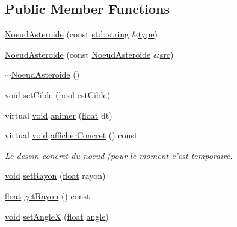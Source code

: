 \subsection*{Public Member Functions}
\begin{DoxyCompactItemize}
\item 
\hyperlink{class_noeud_asteroide_a6879cff59fdc09b742b9e0850bec62a8}{Noeud\-Asteroide} (const \hyperlink{glew_8h_ae84541b4f3d8e1ea24ec0f466a8c568b}{std\-::string} \&\hyperlink{fmod_8h_a5338b9cb3874378d7e5adfbe80a8a381}{type})
\item 
\hyperlink{class_noeud_asteroide_a0cf8165f8385ddfc802312eb3c4abe57}{Noeud\-Asteroide} (const \hyperlink{class_noeud_asteroide}{Noeud\-Asteroide} \&\hyperlink{glew_8h_a72e0fdf0f845ded60b1fada9e9195cd7}{src})
\item 
\hyperlink{class_noeud_asteroide_adbf6fbd81915741bb2f2c44907489e6e}{$\sim$\-Noeud\-Asteroide} ()
\item 
\hyperlink{wglew_8h_aeea6e3dfae3acf232096f57d2d57f084}{void} \hyperlink{class_noeud_asteroide_a987232997d11bee582d5e26cbda9851d}{set\-Cible} (bool est\-Cible)
\item 
virtual \hyperlink{wglew_8h_aeea6e3dfae3acf232096f57d2d57f084}{void} \hyperlink{class_noeud_asteroide_a4f0750d3acc170de96351168456835d8}{animer} (\hyperlink{fmod_8h_aeb841aa4b4b5f444b5d739d865b420af}{float} dt)
\item 
virtual \hyperlink{wglew_8h_aeea6e3dfae3acf232096f57d2d57f084}{void} \hyperlink{class_noeud_asteroide_ab0db59bbf10bb8c24ccf62b84cf2bf10}{afficher\-Concret} () const 
\begin{DoxyCompactList}\small\item\em Le dessin concret du noeud (pour le moment c'est temporaire. \end{DoxyCompactList}\item 
\hyperlink{wglew_8h_aeea6e3dfae3acf232096f57d2d57f084}{void} \hyperlink{class_noeud_asteroide_aa61b44a5531337050117382dd2bbd94d}{set\-Rayon} (\hyperlink{fmod_8h_aeb841aa4b4b5f444b5d739d865b420af}{float} rayon)
\item 
\hyperlink{fmod_8h_aeb841aa4b4b5f444b5d739d865b420af}{float} \hyperlink{class_noeud_asteroide_a2924a9031e94faaf53a26b2afc8f360c}{get\-Rayon} () const 
\item 
\hyperlink{wglew_8h_aeea6e3dfae3acf232096f57d2d57f084}{void} \hyperlink{class_noeud_asteroide_a490e5be76099dfa581df7c104b69162d}{set\-Angle\-X} (\hyperlink{fmod_8h_aeb841aa4b4b5f444b5d739d865b420af}{float} \hyperlink{glew_8h_a6d7a98b0d979b9411a4344a98a7a6122}{angle})

\end{DoxyCompactItemize}
